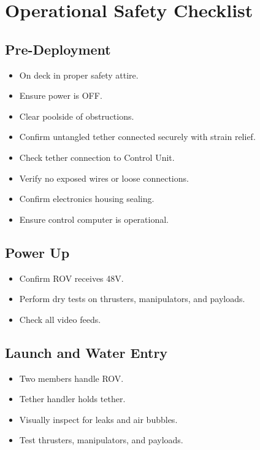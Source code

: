 \section{Operational Safety Checklist} \label{app:operational_safety_checklist}

\subsection{Pre-Deployment}
\begin{itemize}[label=, leftmargin=0pt, itemindent=15pt]
    \setlength{\itemsep}{0pt}
    \item On deck in proper safety attire.
    \item Ensure power is OFF.
    \item Clear poolside of obstructions.
    \item Confirm untangled tether connected securely with strain relief.
    \item Check tether connection to Control Unit.
    \item Verify no exposed wires or loose connections.
    \item Confirm electronics housing sealing.
    \item Ensure control computer is operational.
\end{itemize}
\subsection{Power Up}
\begin{itemize}[label=, leftmargin=0pt, itemindent=15pt]
    \setlength{\itemsep}{0pt} 
    \item Confirm ROV receives 48V.
    \item Perform dry tests on thrusters, manipulators, and payloads.
    \item Check all video feeds.
\end{itemize}
\subsection{Launch and Water Entry}
\begin{itemize}[label=, leftmargin=0pt, itemindent=15pt]
    \setlength{\itemsep}{0pt}
    \item Two members handle ROV.
    \item Tether handler holds tether.
    \item Visually inspect for leaks and air bubbles.
    \item Test thrusters, manipulators, and payloads.
\end{itemize}
